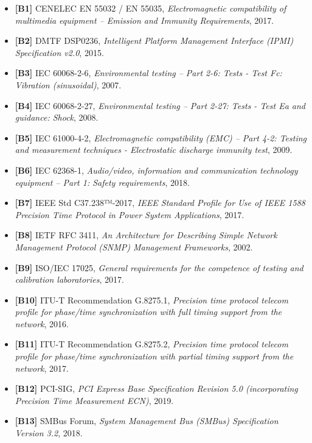 \documentclass[
]{article}
\providecommand{\tightlist}{%
  \setlength{\itemsep}{0pt}\setlength{\parskip}{0pt}}
\begin{document}
\begin{itemize}
\tightlist
\item
  \textbf{{[}B1{]}} CENELEC EN 55032 / EN 55035, \emph{Electromagnetic
  compatibility of multimedia equipment -- Emission and Immunity
  Requirements}, 2017.
\item
  \textbf{{[}B2{]}} DMTF DSP0236, \emph{Intelligent Platform Management
  Interface (IPMI) Specification v2.0}, 2015.
\item
  \textbf{{[}B3{]}} IEC 60068-2-6, \emph{Environmental testing -- Part
  2-6: Tests - Test Fc: Vibration (sinusoidal)}, 2007.
\item
  \textbf{{[}B4{]}} IEC 60068-2-27, \emph{Environmental testing -- Part
  2-27: Tests - Test Ea and guidance: Shock}, 2008.
\item
  \textbf{{[}B5{]}} IEC 61000-4-2, \emph{Electromagnetic compatibility
  (EMC) -- Part 4-2: Testing and measurement techniques - Electrostatic
  discharge immunity test}, 2009.
\item
  \textbf{{[}B6{]}} IEC 62368-1, \emph{Audio/video, information and
  communication technology equipment -- Part 1: Safety requirements},
  2018.
\item
  \textbf{{[}B7{]}} IEEE Std C37.238™-2017, \emph{IEEE Standard Profile
  for Use of IEEE 1588 Precision Time Protocol in Power System
  Applications}, 2017.
\item
  \textbf{{[}B8{]}} IETF RFC 3411, \emph{An Architecture for Describing
  Simple Network Management Protocol (SNMP) Management Frameworks},
  2002.
\item
  \textbf{{[}B9{]}} ISO/IEC 17025, \emph{General requirements for the
  competence of testing and calibration laboratories}, 2017.
\item
  \textbf{{[}B10{]}} ITU-T Recommendation G.8275.1, \emph{Precision time
  protocol telecom profile for phase/time synchronization with full
  timing support from the network}, 2016.
\item
  \textbf{{[}B11{]}} ITU-T Recommendation G.8275.2, \emph{Precision time
  protocol telecom profile for phase/time synchronization with partial
  timing support from the network}, 2017.
\item
  \textbf{{[}B12{]}} PCI-SIG, \emph{PCI Express Base Specification
  Revision 5.0 (incorporating Precision Time Measurement ECN)}, 2019.
\item
  \textbf{{[}B13{]}} SMBus Forum, \emph{System Management Bus (SMBus)
  Specification Version 3.2}, 2018.
\end{itemize}
\end{document}

